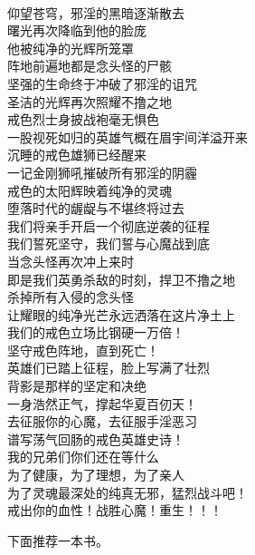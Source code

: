\begin{poem}[戒色英雄史诗]
    \begin{multicols}{2}
        \centering~\\
        仰望苍穹，邪淫的黑暗逐渐散去 \\ 曙光再次降临到他的脸庞 \\ 他被纯净的光辉所笼罩 \\ 阵地前遍地都是念头怪的尸骸 \\ 坚强的生命终于冲破了邪淫的诅咒 \\ 圣洁的光辉再次照耀不撸之地 \\ 戒色烈士身披战袍毫无惧色 \\ 一股视死如归的英雄气概在眉宇间洋溢开来 \\ 沉睡的戒色雄狮已经醒来 \\ 一记金刚狮吼摧破所有邪淫的阴霾 \\ 戒色的太阳辉映着纯净的灵魂 \\ 堕落时代的龌龊与不堪终将过去 \\ 我们将亲手开启一个彻底逆袭的征程 \\ 我们誓死坚守，我们誓与心魔战到底 \\ 当念头怪再次冲上来时 \\ 即是我们英勇杀敌的时刻，捍卫不撸之地 \\ 杀掉所有入侵的念头怪 \\ 让耀眼的纯净光芒永远洒落在这片净土上 \\ 我们的戒色立场比钢硬一万倍！ \\ 坚守戒色阵地，直到死亡！ \\ 英雄们已踏上征程，脸上写满了壮烈 \\ 背影是那样的坚定和决绝 \\ 一身浩然正气，撑起华夏百仞天！ \\ 去征服你的心魔，去征服手淫恶习 \\ 谱写荡气回肠的戒色英雄史诗！ \\ 我的兄弟们你们还在等什么 \\ 为了健康，为了理想，为了亲人 \\ 为了灵魂最深处的纯真无邪，猛烈战斗吧！ \\ 戒出你的血性！战胜心魔！重生！！！
    \end{multicols}
\end{poem}

下面推荐一本书。

